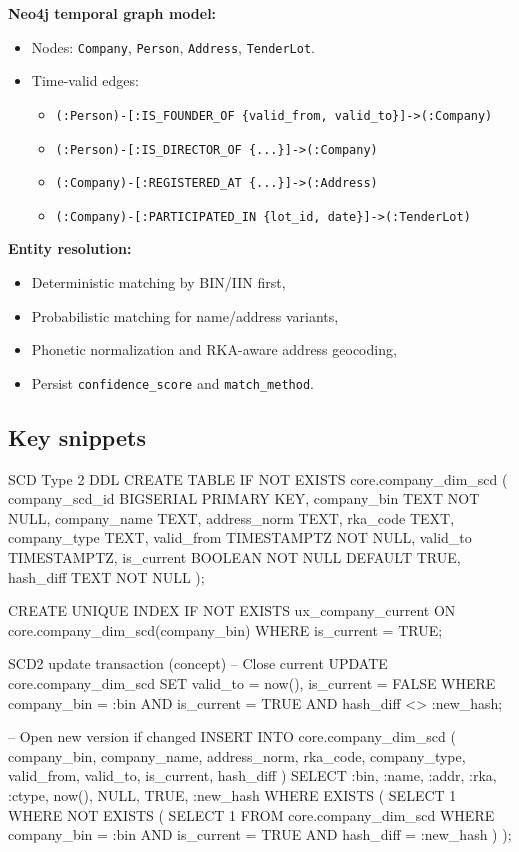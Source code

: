 \documentclass[11pt,a4paper]{article}
\begin{document}
\textbf{Neo4j temporal graph model:}
\begin{itemize}[leftmargin=1.4em]
  \item Nodes: \texttt{Company}, \texttt{Person}, \texttt{Address}, \texttt{TenderLot}.
  \item Time-valid edges:
  \begin{itemize}[leftmargin=1.4em]
    \item \texttt{(:Person)-[:IS\_FOUNDER\_OF \{valid\_from, valid\_to\}]->(:Company)}
    \item \texttt{(:Person)-[:IS\_DIRECTOR\_OF \{...\}]->(:Company)}
    \item \texttt{(:Company)-[:REGISTERED\_AT \{...\}]->(:Address)}
    \item \texttt{(:Company)-[:PARTICIPATED\_IN \{lot\_id, date\}]->(:TenderLot)}
  \end{itemize}
\end{itemize}

\textbf{Entity resolution:}
\begin{itemize}[leftmargin=1.4em]
  \item Deterministic matching by BIN/IIN first,
  \item Probabilistic matching for name/address variants,
  \item Phonetic normalization and RKA-aware address geocoding,
  \item Persist \texttt{confidence\_score} and \texttt{match\_method}.
\end{itemize}

\subsection{Key snippets}
\begin{codeblock}[language=SQL]{SCD Type 2 DDL}
CREATE TABLE IF NOT EXISTS core.company_dim_scd (
    company_scd_id BIGSERIAL PRIMARY KEY,
    company_bin TEXT NOT NULL,
    company_name TEXT,
    address_norm TEXT,
    rka_code TEXT,
    company_type TEXT,
    valid_from TIMESTAMPTZ NOT NULL,
    valid_to TIMESTAMPTZ,
    is_current BOOLEAN NOT NULL DEFAULT TRUE,
    hash_diff TEXT NOT NULL
);

CREATE UNIQUE INDEX IF NOT EXISTS ux_company_current
ON core.company_dim_scd(company_bin)
WHERE is_current = TRUE;
\end{codeblock}

\begin{codeblock}[language=SQL]{SCD2 update transaction (concept)}
-- Close current
UPDATE core.company_dim_scd
SET valid_to = now(), is_current = FALSE
WHERE company_bin = :bin
  AND is_current = TRUE
  AND hash_diff <> :new_hash;

-- Open new version if changed
INSERT INTO core.company_dim_scd (
  company_bin, company_name, address_norm, rka_code, company_type,
  valid_from, valid_to, is_current, hash_diff
)
SELECT :bin, :name, :addr, :rka, :ctype, now(), NULL, TRUE, :new_hash
WHERE EXISTS (
  SELECT 1
  WHERE NOT EXISTS (
    SELECT 1
    FROM core.company_dim_scd
    WHERE company_bin = :bin
      AND is_current = TRUE
      AND hash_diff = :new_hash
  )
);
\end{codeblock}
\end{document}
